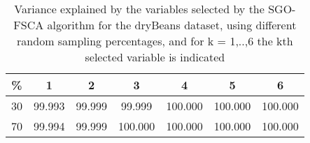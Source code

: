 \begin{table}
	\begin{center}
		\begin{tabular}{c c c c c c c}
			\% & 1 & 2 & 3 & 4 & 5 & 6 \\
			\hline
			30 & 99.993 & 99.999 & 99.999 & 100.000 & 100.000 & 100.000 \\
			70 & 99.994 & 99.999 & 100.000 & 100.000 & 100.000 & 100.000 \\
		\end{tabular}
	\end{center}
	\caption{Variance explained by the variables selected by the SGO-FSCA algorithm for the dryBeans dataset, using different random sampling percentages, and for k = 1,..,6 the kth selected variable is indicated}
\end{table}